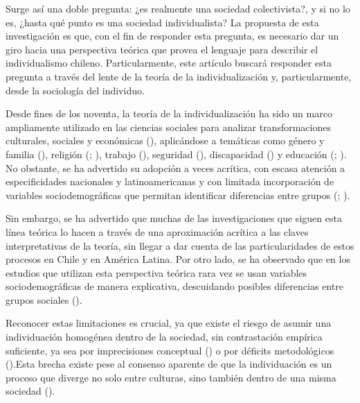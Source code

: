 \documentclass[
  letterpaper,
  DIV=11,
  numbers=noendperiod]{scrartcl}
\begin{document}
Surge así una doble pregunta: ¿es realmente una sociedad colectivista?,
y si no lo es, ¿hasta qué punto es una sociedad individualista? La
propuesta de esta investigación es que, con el fin de responder esta
pregunta, es necesario dar un giro hacia una perspectiva teórica que
provea el lenguaje para describir el individualismo chileno.
Particularmente, este artículo buscará responder esta pregunta a través
del lente de la teoría de la individualización y, particularmente, desde
la sociología del individuo.

Desde fines de los noventa, la teoría de la individualización ha sido un
marco ampliamente utilizado en las ciencias sociales para analizar
transformaciones culturales, sociales y económicas
(), aplicándose a temáticas como
género y familia (),
religión (;
),
trabajo (),
seguridad (),
discapacidad () y educación (;
). No
obstante, se ha advertido su adopción a veces acrítica, con escasa
atención a especificidades nacionales y latinoamericanas y con limitada
incorporación de variables sociodemográficas que permitan identificar
diferencias entre grupos (;
).

Sin embargo, se ha advertido que muchas de las investigaciones que
siguen esta línea teórica lo hacen a través de una aproximación acrítica
a las claves interpretativas de la teoría, sin llegar a dar cuenta de
las particularidades de estos procesos en Chile y en América Latina. Por
otro lado, se ha observado que en los estudios que utilizan esta
perspectiva teórica rara vez se usan variables sociodemográficas de
manera explicativa, descuidando posibles diferencias entre grupos
sociales ().

Reconocer estas limitaciones es crucial, ya que existe el riesgo de
asumir una individuación homogénea dentro de la sociedad, sin
contrastación empírica suficiente, ya sea por imprecisiones conceptual
() o por déficits metodológicos
().Esta brecha existe pese
al consenso aparente de que la individuación es un proceso que diverge
no solo entre culturas, sino también dentro de una misma sociedad
().
\end{document}
